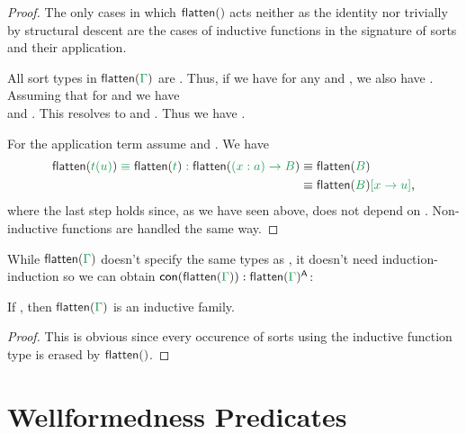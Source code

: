 \begin{proof}
The only cases in which $\flatten{}$ acts neither as the identity nor
trivially by structural descent are the cases of inductive functions in the signature
of sorts and their application.

All sort types in $\flatten{\Gamma}$ are \grm{\UU}.
Thus, if we have  for any \grm{\Delta} and ,
we also have . %
Assuming that for  and 
we have \\ 
and .
This resolves to  and
.
Thus we have .

For the application term assume 
and .
We have 
\begin{align*}
\grm{\flatten{t(u)} \equiv \flatten{t} : \flatten{(x : a) \to B}} &\equiv \grm{\flatten{B}} \\
	&\equiv \grm{\flatten{B}[x \to u]} \text{,}
\end{align*}
where the last step holds since, as we have seen above,  does not depend
on .
Non-inductive functions are handled the same way. %
\end{proof}

While $\flatten{\Gamma}$ doesn't specify the same types as \grm{\Gamma},
it doesn't need induction-induction so we can obtain $\con{\flatten{\Gamma}} : \flatten{\Gamma}^\CC$:
\begin{lemma}
If \grm{\vdash \Gamma}, then $\flatten{\Gamma}$ is an inductive family.
\end{lemma}

\begin{proof}
This is obvious since every occurence of sorts using the inductive function type
is erased by $\flatten{}$.
\end{proof}

\section{Wellformedness Predicates}


